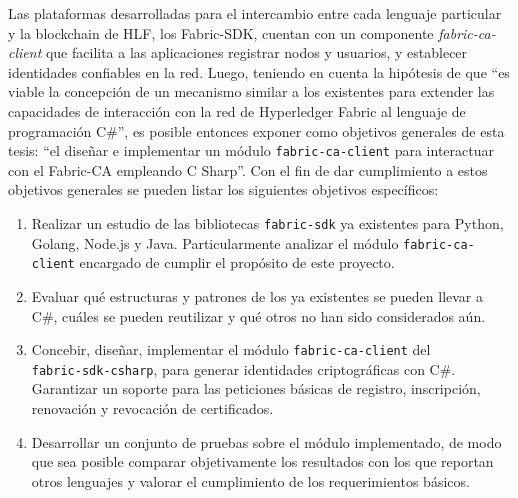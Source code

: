 Las plataformas desarrolladas para el intercambio entre cada lenguaje particular y la blockchain de HLF, los Fabric-SDK, cuentan con un componente \emph{fabric-ca-client} que facilita a las aplicaciones registrar nodos y usuarios, y establecer identidades confiables en la red. Luego, teniendo en cuenta la hipótesis de que “es viable la concepci\'on de un mecanismo similar a los existentes para extender las capacidades de interacci\'on con la red de Hyperledger Fabric al lenguaje de programaci\'on C\#”, es posible entonces exponer como objetivos
generales de esta tesis: “el dise\~nar e implementar un m\'odulo \texttt{fabric-ca-client} para interactuar con el Fabric-CA empleando C Sharp”.
Con el fin de dar cumplimiento a estos objetivos generales se pueden listar los siguientes objetivos específicos:

 

\begin{enumerate}
	\item Realizar un estudio de las bibliotecas \texttt{fabric-sdk} ya existentes para Python, Golang, Node.js y Java. Particularmente analizar el m\'odulo \texttt{fabric-ca-client} encargado de cumplir el prop\'osito de este proyecto. 
	
	\item Evaluar qu\'e estructuras y patrones de los ya existentes se pueden llevar a C\#, cu\'ales se pueden reutilizar y qu\'e otros no han sido considerados a\'un.
	
	\item Concebir, dise\~nar, implementar el m\'odulo \texttt{fabric-ca-client} del
	\\
	\texttt{fabric-sdk-csharp}, para generar identidades criptogr\'aficas con C\#. Garantizar un soporte para las peticiones b\'asicas de registro, inscripci\'on, renovaci\'on y revocaci\'on de certificados.
	
	
	\item Desarrollar un conjunto de pruebas sobre el m\'odulo implementado, de modo que sea posible comparar objetivamente los resultados con los que reportan otros lenguajes y valorar el cumplimiento de los requerimientos b\'asicos.
\end{enumerate}

